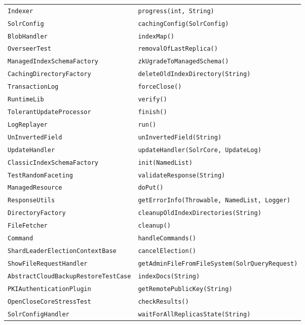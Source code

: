 \begin{center}
\begin{longtable}{ll}
\lstinline/Indexer/&{\lstinline/progress(int, String)/}\\
\lstinline/SolrConfig/&{\lstinline/cachingConfig(SolrConfig)/}\\
\lstinline/BlobHandler/&{\lstinline/indexMap()/}\\
\lstinline/OverseerTest/&{\lstinline/removalOfLastReplica()/}\\
\lstinline/ManagedIndexSchemaFactory/&{\lstinline/zkUgradeToManagedSchema()/}\\
\lstinline/CachingDirectoryFactory/&{\lstinline/deleteOldIndexDirectory(String)/}\\
\lstinline/TransactionLog/&{\lstinline/forceClose()/}\\
\lstinline/RuntimeLib/&{\lstinline/verify()/}\\
\lstinline/TolerantUpdateProcessor/&{\lstinline/finish()/}\\
\lstinline/LogReplayer/&{\lstinline/run()/}\\
\lstinline/UnInvertedField/&{\lstinline/unInvertedField(String)/}\\
\lstinline/UpdateHandler/&{\lstinline/updateHandler(SolrCore, UpdateLog)/}\\
\lstinline/ClassicIndexSchemaFactory/&{\lstinline/init(NamedList)/}\\
\lstinline/TestRandomFaceting/&{\lstinline/validateResponse(String)/}\\
\lstinline/ManagedResource/&{\lstinline/doPut()/}\\
\lstinline/ResponseUtils/&{\lstinline/getErrorInfo(Throwable, NamedList, Logger)/}\\
\lstinline/DirectoryFactory/&{\lstinline/cleanupOldIndexDirectories(String)/}\\
\lstinline/FileFetcher/&{\lstinline/cleanup()/}\\
\lstinline/Command/&{\lstinline/handleCommands()/}\\
\lstinline/ShardLeaderElectionContextBase/&{\lstinline/cancelElection()/}\\
\lstinline/ShowFileRequestHandler/&{\lstinline/getAdminFileFromFileSystem(SolrQueryRequest)/}\\
\lstinline/AbstractCloudBackupRestoreTestCase/&{\lstinline/indexDocs(String)/}\\
\lstinline/PKIAuthenticationPlugin/&{\lstinline/getRemotePublicKey(String)/}\\
\lstinline/OpenCloseCoreStressTest/&{\lstinline/checkResults()/}\\
\lstinline/SolrConfigHandler/&{\lstinline/waitForAllReplicasState(String)/}\\

\end{longtable}
\end{center}
